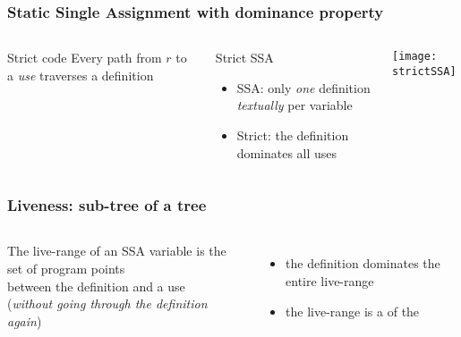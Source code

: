 \begin{frame}[noframenumbering,label=strictSSA]
  \frametitle{Static Single Assignment with dominance property}
  \begin{columns}
    \begin{block}{Strict code}
      Every path from $r$ to a \emph{use} traverses a definition
    \end{block}
    \begin{block}{Strict SSA}
      \begin{itemize}
      \item \alert{SSA}: only \emph{one} definition \emph{textually} per variable
      \item \alert{Strict}: the definition dominates all uses
      \end{itemize}
    \end{block}
    \hfill
    \texttt{[image: strictSSA]}
  \end{columns}
\end{frame}

\begin{frame}[noframenumbering,label=chordal]
  \frametitle{Liveness: sub-tree of a tree}
  \begin{columns}
      \begin{block}{The live-range of an SSA variable is}
        the set of program points\\ \alert{between the definition and a use}\\
        \footnotesize (\emph{without going through the definition again})
      \end{block}
    \begin{itemize}
      \item<2> the definition dominates the entire live-range
      \item<2> the live-range is a  of the 
    \end{itemize}
  \end{columns}
\end{frame}

